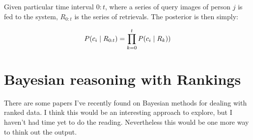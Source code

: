 \documentclass[10pt,a4paper,final]{article}
\begin{document}
Given particular time interval $0:t$, where a series of query images of person $j$ is fed to the system,  $R_{0:t}$ is the series of retrievals. The posterior is then simply:

\begin{equation}
	\label{eq:joint_third_idea}
		P(c_i \mid R_{0:t}) =  \prod_{k=0}^{t} P(c_{i} \mid R_k)) \\ 
\end{equation}

\section{Bayesian reasoning with Rankings}

There are some papers I've recently found on Bayesian methods for dealing with ranked data. I think this would be an interesting approach to explore, but I haven't had time yet to do the reading. Nevertheless this would be one more way to think out the output.
\end{document}
